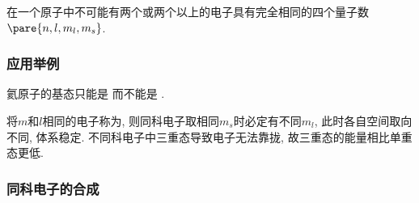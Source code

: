 \documentclass[hidelinks]{ctexart}
\begin{document}
\begin{resume}
    \begin{theorem}
        在一个原子中不可能有两个或两个以上的电子具有完全相同的四个量子数$\pare{n,l,m_l,m_s}$.
    \end{theorem}
\end{resume}

\subsubsection{应用举例} %
\label{ssub:应用举例}

\begin{theorem}
    氦原子的基态只能是 而不能是 .
\end{theorem}
将$m$和$l$相同的电子称为, 则同科电子取相同$m_s$时必定有不同$m_l$, 此时各自空间取向不同, 体系稳定. 不同科电子中三重态导致电子无法靠拢, 故三重态的能量相比单重态更低.


\subsubsection{同科电子的合成} %
\label{ssub:同科电子的合成}
\end{document}
